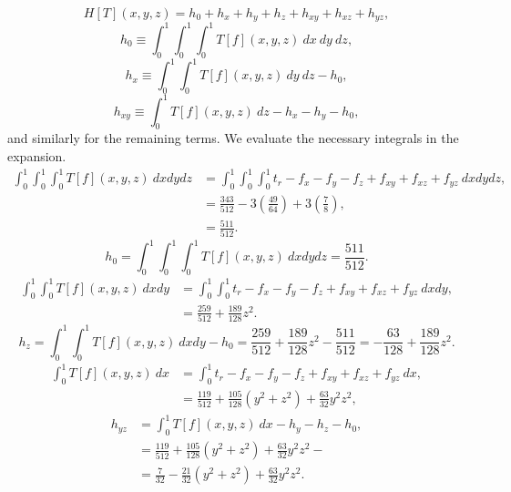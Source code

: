 \begin{equation}
  H[T](x,y,z) = h_0 + h_x + h_y + h_z + h_{xy} + h_{xz} + h_{yz},
\end{equation}
\begin{equation}
  h_0 \equiv \int_0^1\int_0^1\int_0^1 T[f](x,y,z)\ dx\ dy\ dz,
\end{equation}
\begin{equation}
  h_x \equiv \int_0^1\int_0^1 T[f](x,y,z)\ dy\ dz - h_0,
\end{equation}
\begin{equation}
  h_{xy} \equiv \int_0^1 T[f](x,y,z)\ dz - h_x - h_y - h_0,
\end{equation}
and similarly for the remaining terms.  We evaluate the necessary integrals in the expansion.
\begin{align}
  \int_0^1\int_0^1\int_0^1 T[f](x,y,z)\ dxdydz &= \int_0^1\int_0^1\int_0^1 t_r - f_x - f_y - f_z + f_{xy} +
    f_{xz} + f_{yz}\ dxdydz,\nonumber \\
    &= \frac{343}{512} - 3\left(\frac{49}{64}\right) + 3\left(\frac{7}{8}\right), \nonumber\\
    &= \frac{511}{512}.\nonumber
\end{align}
\begin{equation}
  h_0 = \int_0^1\int_0^1\int_0^1 T[f](x,y,z)\ dxdydz = \frac{511}{512}.
\end{equation}
\begin{align}
  \int_0^1\int_0^1 T[f](x,y,z)\ dxdy &= \int_0^1\int_0^1 t_r - f_x - f_y - f_z + f_{xy} +
    f_{xz} + f_{yz}\ dxdy, \nonumber\\
    &= \frac{259}{512} + \frac{189}{128}z^2. \nonumber
\end{align}
\begin{equation}
  h_z = \int_0^1\int_0^1 T[f](x,y,z)\ dxdy - h_0 = \frac{259}{512} + \frac{189}{128}z^2 - \frac{511}{512} =
  -\frac{63}{128} + \frac{189}{128}z^2.
\end{equation}
\begin{align}
  \int_0^1 T[f](x,y,z)\ dx &= \int_0^1 t_r - f_x - f_y - f_z + f_{xy} + f_{xz} + f_{yz}\ dx, \nonumber\\
  &= \frac{119}{512} + \frac{105}{128}(y^2+z^2)+ \frac{63}{32}y^2z^2,\nonumber
\end{align}
\begin{align}
  h_{yz} &=\int_0^1 T[f](x,y,z)\ dx - h_y - h_z - h_0,\nonumber\\
  &= \frac{119}{512} + \frac{105}{128}(y^2+z^2)+ \frac{63}{32}y^2z^2 - \nonumber\\
  &=\frac{7}{32} - \frac{21}{32}(y^2+z^2) + \frac{63}{32}y^2z^2.
\end{align}

